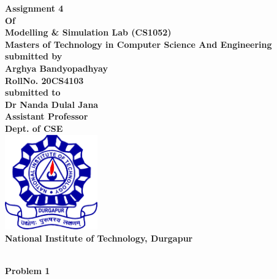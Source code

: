 \documentclass[12pt, letterpaper, twoside]{book}
\date{3nd June 2021}
\begin{document}
\begin{titlepage}
	\begin{center}
       \vspace*{5cm}
       \bfseries\Large
    	Assignment 4\\
    	Of\\
    	Modelling \& Simulation Lab (CS1052)\\
        \vskip1cm
        Masters of Technology in Computer Science And Engineering\\
        \vskip1cm
        submitted by\\
    	Arghya Bandyopadhyay\\
    	RollNo. 20CS4103\\
    	\vskip1cm
    	submitted to\\
    	Dr Nanda Dulal Jana\\
    	Assistant Professor\\
    	Dept. of CSE\\
    	\vskip1cm
    	\includegraphics[width=4cm]{NITDGP}\\
    	National Institute of Technology, Durgapur\\
    \end{center}
\end{titlepage}
\begin{center}
\textbf{\\Problem 1}
\end{center}
\end{document}
